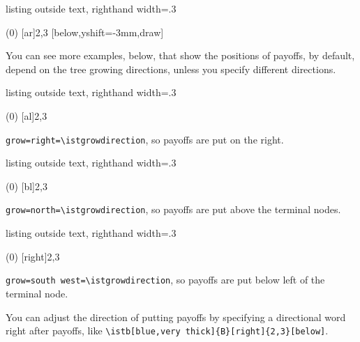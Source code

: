 \begin{tcblisting}{listing outside text, righthand width=.3\linewidth}
\begin{istgame}
\istroot(0)
  [ar]{2,3}
        [below,yshift=-3mm,draw]
  \endist
\end{istgame}
\end{tcblisting}

You can see more examples, below, that show the positions of payoffs, by default, depend on the tree growing directions, unless you specify different directions.

\begin{tcblisting}{listing outside text, righthand width=.3\linewidth}
\begin{istgame}
\istroot[right](0)
  [al]{2,3}
  \endist
\xtHideTerminalNodes
\end{istgame}
\end{tcblisting}

\verb|grow=right=\istgrowdirection|, so payoffs are put on the right.

\begin{tcblisting}{listing outside text, righthand width=.3\linewidth}
\begin{istgame}
\istroot(0)
  [bl]{2,3}
  \endist
\end{istgame}
\end{tcblisting}

\verb|grow=north=\istgrowdirection|, so payoffs are put above the terminal nodes.

\begin{tcblisting}{listing outside text, righthand width=.3\linewidth}
\begin{istgame}
(0)
  [right]{2,3}
  \endist
\end{istgame}
\end{tcblisting}

\verb|grow=south west=\istgrowdirection|, so payoffs are put below left of the terminal node.

You can adjust the direction of putting payoffs by specifying a directional word right after payoffs, like \verb|\istb[blue,very thick]{B}[right]{2,3}[below]|. 

